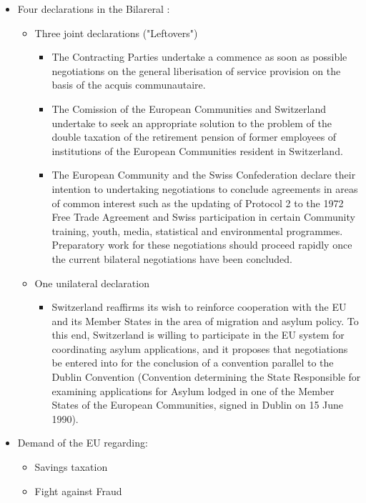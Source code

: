 \begin{itemize}
    \item Four declarations in the Bilareral :
        \begin{itemize}
            \item Three joint declarations ("Leftovers")
                \begin{itemize}
                    \item The Contracting Parties undertake a commence as soon
                        as possible negotiations on the general liberisation
                        of service provision on the basis of the acquis
                        communautaire.
                    \item The Comission of the European Communities and Switzerland
                        undertake to seek an appropriate solution to the problem of
                        the double taxation of the retirement pension of former
                        employees of institutions of the European Communities
                        resident in Switzerland.
                    \item The European Community and the Swiss Confederation declare
                        their intention to undertaking negotiations to conclude
                        agreements in areas of common interest such as the updating
                        of Protocol 2 to the 1972 Free Trade Agreement and Swiss
                        participation in certain Community training, youth, media,
                        statistical and environmental programmes. Preparatory work
                        for these negotiations should proceed rapidly once the current
                        bilateral negotiations have been concluded.
                \end{itemize}
            \item One unilateral declaration
                \begin{itemize}
                    \item Switzerland reaffirms its wish to reinforce cooperation
                        with the EU and its Member States in the area of migration
                        and asylum policy. To this end, Switzerland is willing to
                        participate in the EU system for coordinating asylum
                        applications, and it proposes that negotiations be
                        entered into for the conclusion of a convention
                        parallel to the Dublin Convention (Convention determining
                        the State Responsible for examining applications for
                        Asylum lodged in one of the Member States of the
                        European Communities, signed in Dublin on 15 June 1990).
                \end{itemize}
        \end{itemize}
    \item Demand of the EU regarding:
        \begin{itemize}
            \item Savings taxation
            \item Fight against Fraud
        \end{itemize}
\end{itemize}
